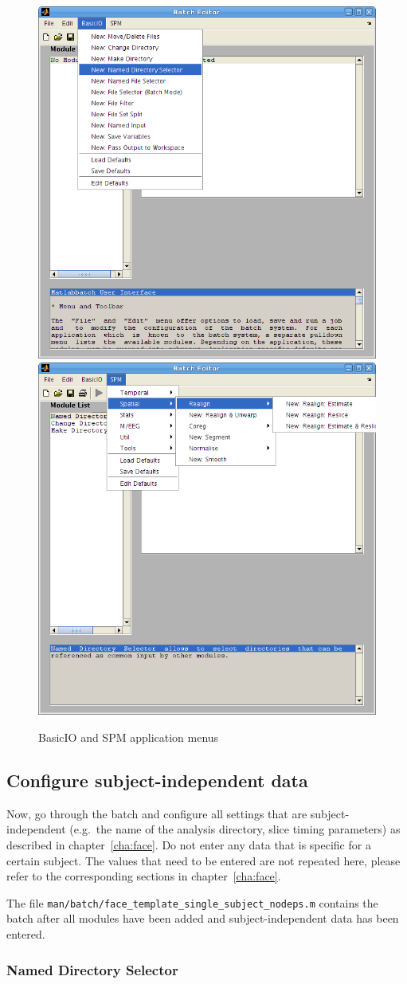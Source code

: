 \begin{figure}
  \centering
  \includegraphics[width=.49\linewidth]{batch/batch_basicio}
  \hfill
  \includegraphics[width=.49\linewidth]{batch/batch_spm}      
  \caption{BasicIO and SPM application menus}
  \label{fig:basicio_spm}
\end{figure}

\subsection{Configure subject-independent data}

Now, go through the batch and configure all settings that are
subject-independent (e.g.\ the name of the analysis directory, slice timing
parameters) as described in chapter~\ref{cha:face}. Do not enter any data that
is specific for a certain subject. The values that need to be entered are not
repeated here, please refer to the corresponding sections in
chapter~\ref{cha:face}.

The file \verb|man/batch/face_template_single_subject_nodeps.m| contains the
batch after all modules have been added and subject-independent data has been
entered.

\subsubsection*{Named Directory Selector}

